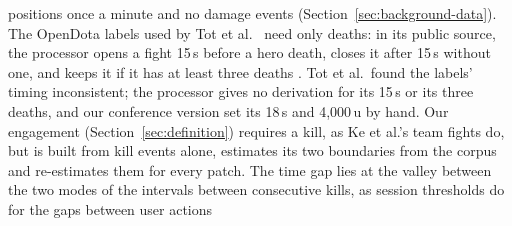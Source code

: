 positions once a minute and no damage events (Section~\ref{sec:background-data}). The
OpenDota labels used by Tot et al.\ \cite{tot2021camera} need only deaths: in its public source, the
processor opens a fight 15\,s before a hero death, closes it after 15\,s without one, and keeps it if
it has at least three deaths \cite{opendota2018processteamfights}. Tot et al.\ found the labels' timing
inconsistent; the processor gives no derivation for its 15\,s or its three deaths, and our conference
version set its 18\,s and 4,000\,u by hand.
Our engagement (Section~\ref{sec:definition}) requires a kill, as Ke et al.'s team fights do, but is
built from kill events alone, estimates its two boundaries from the corpus and re-estimates them for
every patch. The time gap lies at the valley between the two modes of the intervals between
consecutive kills, as session thresholds do for the gaps between user actions
